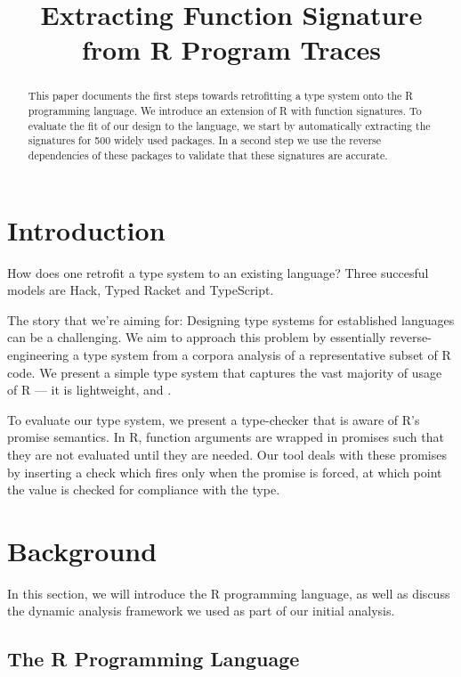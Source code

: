 \documentclass[acmsmall,review,anonymous]{acmart}\settopmatter{printfolios=true,printccs=false,printacmref=false}
\begin{document}
\title{Extracting Function Signature from R Program Traces}

\begin{abstract}
  This paper documents the first steps towards retrofitting a type system
  onto the R programming language. We introduce an extension of R with
  function signatures. To evaluate the fit of our design to the language, we
  start by automatically extracting the signatures for 500 widely used
  packages. In a second step we use the reverse dependencies of these
  packages to validate that these signatures are accurate.
\end{abstract}
\maketitle


\section{Introduction}

How does one retrofit a type system to an existing language? Three succesful
models are Hack, Typed Racket and TypeScript. 


The story that we're aiming for: Designing type systems for established
languages can be a challenging.  We aim to approach this problem by
essentially reverse-engineering a type system from a corpora analysis of a
representative subset of R code.  We present a simple type system that
captures the vast majority of usage of R --- it is lightweight, and
.

To evaluate our type system, we present a type-checker that is aware of R's
promise semantics.  In R, function arguments are wrapped in promises such
that they are not evaluated until they are needed.  Our tool deals with
these promises by inserting a check which fires only when the promise is
forced, at which point the value is checked for compliance with the type.


%
%
%
\section{Background}

In this section, we will introduce the R programming language, as well as discuss the dynamic analysis framework we used as part of our initial analysis.

%
%
%
%
\subsection{The R Programming Language}
\label{sec:R}
\end{document}

